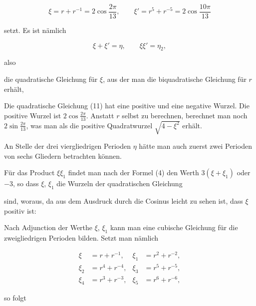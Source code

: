 \[
\xi = r + r^{-1} = 2\cos\frac{2\pi}{13}, \qquad \xi' = r^5 + r^{-5} = 2\cos\frac{10\pi}{13}
\]

setzt. Es ist nämlich

\[
\xi + \xi' = \eta, \qquad \xi\xi' = \eta_2,
\]

also


die quadratische Gleichung für $\xi$, aus der man die biquadratische
Gleichung für $r$ erhält,


Die quadratische Gleichung (11) hat eine positive und eine
negative Wurzel. Die positive Wurzel ist $2\cos\frac{2\pi}{13}$. Anstatt $r$
selbst zu berechnen, berechnet man noch $2\sin\frac{2\pi}{13}$, was man als
die positive Quadratwurzel $\sqrt{4 - \xi^2}$ erhält.

An Stelle der drei viergliedrigen Perioden $\eta$ hätte man auch
zuerst zwei Perioden von sechs Gliedern betrachten können.


Für das Product $\xi\xi_1$ findet man nach der Formel (4) den
Werth $3(\xi + \xi_1)$ oder $-3$, so dass $\xi$, $\xi_1$ die Wurzeln der quadratischen Gleichung


sind, woraus, da aus dem Ausdruck durch die Cosinus leicht zu
sehen ist, dass $\xi$ positiv ist:


Nach Adjunction der Werthe $\xi$, $\xi_1$ kann man eine cubische
Gleichung für die zweigliedrigen Perioden bilden. Setzt man
nämlich

\[
\begin{aligned}
\xi &= r + r^{-1}, & \xi_1 &= r^2 + r^{-2},\\
\xi_2 &= r^4 + r^{-4}, & \xi_3 &= r^5 + r^{-5},\\
\xi_4 &= r^3 + r^{-3}, & \xi_5 &= r^6 + r^{-6},
\end{aligned}
\]

so folgt

